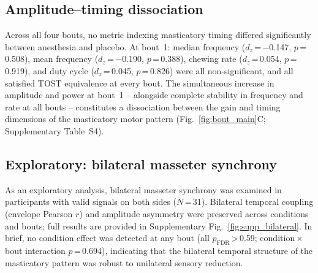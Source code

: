 \subsection*{Amplitude--timing dissociation}

Across all four bouts, no metric indexing masticatory timing differed
significantly between anesthesia and placebo.
At bout~1: median frequency ($d_z$\,=\,$-$0.147, $p$\,=\,0.508), mean
frequency ($d_z$\,=\,$-$0.190, $p$\,=\,0.388), chewing rate
($d_z$\,=\,0.054, $p$\,=\,0.919), and duty cycle ($d_z$\,=\,0.045,
$p$\,=\,0.826) were all non-significant, and all satisfied TOST equivalence
at every bout.
The simultaneous increase in amplitude and power at bout~1 -- alongside
complete stability in frequency and rate at all bouts -- constitutes a
dissociation between the gain and timing dimensions of the masticatory
motor pattern (Fig.~\ref{fig:bout_main}C; Supplementary Table~S4).

\subsection*{Exploratory: bilateral masseter synchrony}

As an exploratory analysis, bilateral masseter synchrony was examined in
participants with valid signals on both sides ($N$\,=\,31).
Bilateral temporal coupling (envelope Pearson $r$) and amplitude asymmetry
were preserved across conditions and bouts; full results are provided in
Supplementary Fig.~\ref{fig:supp_bilateral}.
In brief, no condition effect was detected at any bout
(all $p_{\text{FDR}}$\,>\,0.59; condition\,$\times$\,bout interaction
$p$\,=\,0.694), indicating that the bilateral temporal structure of the
masticatory pattern was robust to unilateral sensory reduction.

